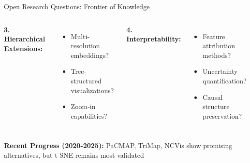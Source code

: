\documentclass[aspectratio=169]{beamer}
\begin{document}
\begin{frame}{Open Research Questions: Frontier of Knowledge}
\begin{columns}
\textbf{3. Hierarchical Extensions:}
\begin{itemize}
\item Multi-resolution embeddings?
\item Tree-structured visualizations?
\item Zoom-in capabilities?
\end{itemize}

\textbf{4. Interpretability:}
\begin{itemize}
\item Feature attribution methods?
\item Uncertainty quantification?
\item Causal structure preservation?
\end{itemize}
\end{columns}

\vspace{0.3cm}
\textbf{Recent Progress (2020-2025):}
PaCMAP, TriMap, NCVis show promising alternatives, but t-SNE remains most validated
\end{frame}
\end{document}
